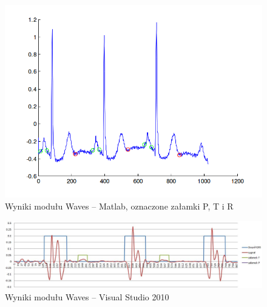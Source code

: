 \documentclass[a4paper, 11pt]{article}
\begin{document}
\begin{center}
%
\begin{figure}
\begin{centering}
\includegraphics[scale=0.4]{include/waves_matlab2}
\par\end{centering}

\caption{Wyniki modułu Waves -- Matlab, oznaczone załamki P, T i R }
\label{fig:waves_matlab2}
\end{figure}

\par\end{center}

\begin{center}
%
\begin{figure}
\begin{centering}
\includegraphics[scale=0.4]{include/waves_cpp}
\par\end{centering}

\caption{Wyniki modułu Waves -- Visual Studio 2010}
\label{fig:waves_cpp}
\end{figure}

\par\end{center}
\end{document}
